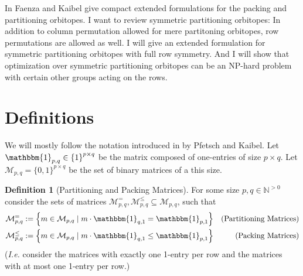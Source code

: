 \documentclass[a4paper]{amsart}
\theoremstyle{lemma}
\theoremstyle{definition}
\newtheorem{defn}[theorem]{Definition}
\theoremstyle{remark}
\theoremstyle{example}
\def\Ie{\emph{I.e.}}
\newcommand{\lrM}[1]{\ensuremath{\left\{ #1 \right\}}}
\newcommand{\naturals}{\ensuremath{\mathbb{N}}}
\newcommand{\M}{\ensuremath{\mathcal{M}}}
\begin{document}
In \cite{faenza-2008} Faenza and Kaibel give compact extended
formulations for the packing and partitioning orbitopes.
I want to review symmetric partitioning orbitopes: In addition
to column permutation allowed for mere partitoning orbitopes, row
permutations are allowed as well.  I will give an extended formulation
for symmetric partitioning orbitopes with full row symmetry. And I
will show that optimization over symmetric partitioning orbitopes can
be an NP-hard problem with certain other groups acting on the rows.



\section{Definitions}
We will mostly follow the notation introduced in \cite{orbi} by Pfetsch
and Kaibel.  Let \(\mathbbm{1}_{p,q} \in \lrM{1}^{p \times q}\) be the matrix composed of one-entries of size \(p \times q\).
Let \(\M_{p,q} = \{0, 1\}^{p \times q} \) be the set of binary matrices of a this size. 

\begin{defn}[Partitioning and Packing Matrices]
  For some size \(p, q \in \naturals^{>0}\) consider the sets of
  matrices \(\M_{p,q}^{=},\M_{p,q}^{\leq} \subseteq \M_{p, q}\), such
  that 
  \begin{align}
    \M_{p,q}^{=} & := \lrM{m \in \M_{p,q} \mid m \cdot \mathbbm{1}_{q, 1} = \mathbbm{1}_{p, 1}} & \text{(Partitioning Matrices)}\\
    \M_{p,q}^{\leq} & := \lrM{m \in \M_{p,q} \mid m \cdot \mathbbm{1}_{q, 1} \leq \mathbbm{1}_{p, 1}} & \text{(Packing Matrices)}
  \end{align}
  (\Ie{} consider the matrices with exactly one 1-entry per row and the matrices with at most one 1-entry per row.)
\end{defn}
\end{document}
